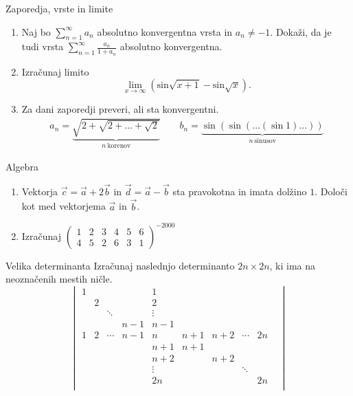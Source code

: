 \begin{frame}{Zaporedja, vrste in limite}
	\begin{enumerate}
		\item 
		Naj bo $\sum_{n=1}^{\infty} a_n$ absolutno konvergentna vrsta in $a_n \ne -1$.
		Dokaži, da je tudi vrsta $\sum_{n=1}^\infty \frac{a_n}{1+a_n}$
		absolutno konvergentna.

		\item
		Izračunaj limito
		\[\lim_{x \to \infty} (\text{sin} \sqrt{x+1} - \text{sin} \sqrt{x}).\]

		\item
		Za dani zaporedji preveri, ali sta konvergentni.
		\begin{align*}
			a_n = \underbrace{\sqrt{2+\sqrt{2+\dots+\sqrt{2}}}}_{n~\text{korenov}} \qquad
			b_n = \underbrace{\sin(\sin(\dots(\sin 1)\dots))}_{n~\text{sinusov}}
		\end{align*}
	\end{enumerate}
\end{frame}

\begin{frame}{Algebra}
	\begin{enumerate}
		\item
		Vektorja $\vec{c} =\vec{a}+ 2 \vec{b} $ in $\vec{d} =\vec{a}- \vec{b} $
		sta pravokotna in imata dolžino $1$. Določi kot med vektorjema $\vec{a}$ in $\vec{b}$.
		\item 
		Izračunaj
		$\begin{pmatrix}
			1 & 2 & 3 & 4 & 5 & 6\\
			4 & 5 & 2 & 6 & 3 & 1
			\end{pmatrix}^{-2000}	
		$
	\end{enumerate}
\end{frame}

\begin{frame}{Velika determinanta}
	Izračunaj naslednjo determinanto $2n \times 2n$, ki ima na neoznačenih mestih ničle.
	$$\begin{vmatrix}
		1 & & & & 1 & & & & \\
		& 2 & & & 2 & & & & \\
		& &\ddots & & \vdots & & & & &\\
		& & & n-1 & n-1 & & & & \\
		1 & 2 & \cdots & n-1 & n & n+1 & n+2 & \cdots & 2n\\
		& & & & n+1 & n+1 & & & \\
		& & & & n+2 & & n+2 & & \\
		& & & & \vdots & & & \ddots & \\
		& & & & 2n & & & & 2n\\
		\end{vmatrix}$$
\end{frame}

